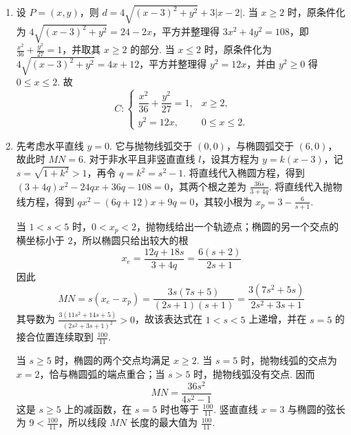 \begin{solution}
\begin{enumerate}
\item 设 \(P=(x,y)\)，则 \(d=4\sqrt{(x-3)^2+y^2}+3|x-2|\). 当 \(x\geqslant2\) 时，原条件化为 \(4\sqrt{(x-3)^2+y^2}=24-2x\)，平方并整理得 \(3x^2+4y^2=108\)，即 \(\frac{x^2}{36}+\frac{y^2}{27}=1\)，并取其 \(x\geqslant2\) 的部分. 当 \(x\leqslant2\) 时，原条件化为 \(4\sqrt{(x-3)^2+y^2}=4x+12\)，平方并整理得 \(y^2=12x\)，并由 \(y^2\geqslant0\) 得 \(0\leqslant x\leqslant2\). 故
\[
C:\begin{cases}
\dfrac{x^2}{36}+\dfrac{y^2}{27}=1, & x\geqslant2,\\
y^2=12x, & 0\leqslant x\leqslant2.
\end{cases}
\]
\item 先考虑水平直线 \(y=0\). 它与抛物线弧交于 \((0,0)\)，与椭圆弧交于 \((6,0)\)，故此时 \(MN=6\). 对于非水平且非竖直直线 \(l\)，设其方程为 \(y=k(x-3)\)，记 \(s=\sqrt{1+k^2}>1\)，再令 \(q=k^2=s^2-1\). 将直线代入椭圆方程，得到 \((3+4q)x^2-24qx+36q-108=0\)，其两个根之差为 \(\frac{36s}{3+4q}\). 将直线代入抛物线方程，得到 \(qx^2-(6q+12)x+9q=0\)，其较小根为 \(x_p=3-\frac6{s+1}\).

当 \(1<s<5\) 时，\(0<x_p<2\)，抛物线给出一个轨迹点；椭圆的另一个交点的横坐标小于 \(2\)，所以椭圆只给出较大的根
\[
x_e=\frac{12q+18s}{3+4q}=\frac{6(s+2)}{2s+1}
\]
因此
\[
MN=s(x_e-x_p)=\frac{3s(7s+5)}{(2s+1)(s+1)}=\frac{3(7s^2+5s)}{2s^2+3s+1}
\]
其导数为 \(\frac{3(11s^2+14s+5)}{(2s^2+3s+1)^2}>0\)，故该表达式在 \(1<s<5\) 上递增，并在 \(s=5\) 的接合位置连续取到 \(\frac{100}{11}\).

当 \(s\geqslant5\) 时，椭圆的两个交点均满足 \(x\geqslant2\). 当 \(s=5\) 时，抛物线弧的交点为 \(x=2\)，恰与椭圆弧的端点重合；当 \(s>5\) 时，抛物线弧没有交点. 因而
\[
MN=\frac{36s^2}{4s^2-1}
\]
这是 \(s\geqslant5\) 上的减函数，在 \(s=5\) 时也等于 \(\frac{100}{11}\). 竖直直线 \(x=3\) 与椭圆的弦长为 \(9<\frac{100}{11}\)，所以线段 \(MN\) 长度的最大值为 \(\frac{100}{11}\).
\end{enumerate}
\end{solution}

